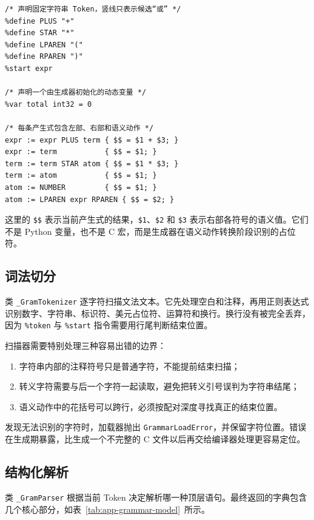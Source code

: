\begin{lstlisting}
/* 声明固定字符串 Token，竖线只表示候选“或” */
%define PLUS "+"
%define STAR "*"
%define LPAREN "("
%define RPAREN ")"
%start expr

/* 声明一个由生成器初始化的动态变量 */
%var total int32 = 0

/* 每条产生式包含左部、右部和语义动作 */
expr := expr PLUS term { $$ = $1 + $3; }
expr := term           { $$ = $1; }
term := term STAR atom { $$ = $1 * $3; }
term := atom           { $$ = $1; }
atom := NUMBER         { $$ = $1; }
atom := LPAREN expr RPAREN { $$ = $2; }
\end{lstlisting}

这里的 \texttt{\$\$} 表示当前产生式的结果，\texttt{\$1}、\texttt{\$2} 和 \texttt{\$3} 表示右部各符号的语义值。它们不是 Python 变量，也不是 C 宏，而是生成器在语义动作转换阶段识别的占位符。

\subsection{词法切分}

类 \texttt{\_GramTokenizer} 逐字符扫描文法文本。它先处理空白和注释，再用正则表达式识别数字、字符串、标识符、美元占位符、运算符和换行。换行没有被完全丢弃，因为 \texttt{\%token} 与 \texttt{\%start} 指令需要用行尾判断结束位置。

扫描器需要特别处理三种容易出错的边界：

\begin{enumerate}
\item 字符串内部的注释符号只是普通字符，不能提前结束扫描；
\item 转义字符需要与后一个字符一起读取，避免把转义引号误判为字符串结尾；
\item 语义动作中的花括号可以跨行，必须按配对深度寻找真正的结束位置。
\end{enumerate}

发现无法识别的字符时，加载器抛出 \texttt{GrammarLoadError}，并保留字符位置。错误在生成期暴露，比生成一个不完整的 C 文件以后再交给编译器处理更容易定位。

\subsection{结构化解析}

类 \texttt{\_GramParser} 根据当前 Token 决定解析哪一种顶层语句。最终返回的字典包含几个核心部分，如表~\ref{tab:app-grammar-model}~所示。

